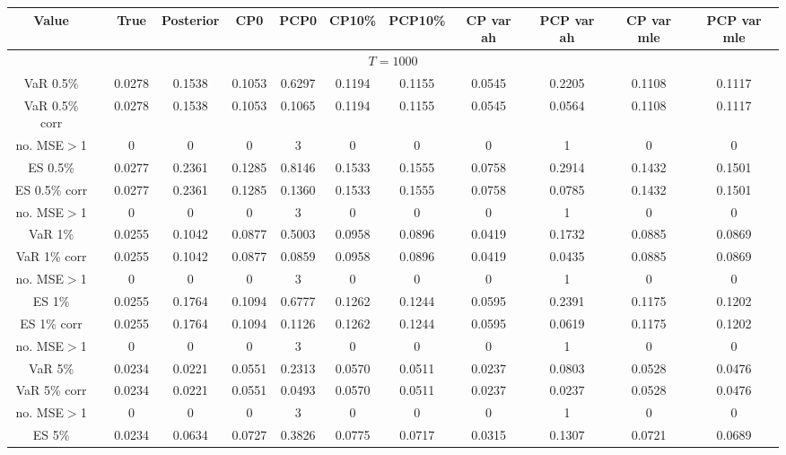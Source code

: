{ \tiny 
{ \renewcommand{\arraystretch}{1.1} 
\begin{sidewaystable} 
\center 
\begin{tabular}{cc cc | cccc | cccc} 
Value && True & Posterior & CP0  & PCP0 & CP10\%  & PCP10\% &CP var ah & PCP var ah & CP var mle & PCP var mle \\ \hline 
\hline 
\multicolumn{12}{c}{$T =1000$}  \\ 
\hline 
VaR 0.5\% && 0.0278 & 0.1538 & 0.1053 & 0.6297 & 0.1194 & 0.1155 &0.0545 & 0.2205 & 0.1108 & 0.1117 \\ 
VaR 0.5\% corr && 0.0278 & 0.1538 & 0.1053 & 0.1065 & 0.1194 & 0.1155 &0.0545 & 0.0564 & 0.1108 & 0.1117 \\ 
no. MSE$>$1 && 0 & 0 & 0 & 3 & 0 & 0 &0 & 1 & 0 & 0 \\[1ex] 
ES 0.5\% && 0.0277 & 0.2361 & 0.1285 & 0.8146 & 0.1533 & 0.1555 &0.0758 & 0.2914 & 0.1432 & 0.1501 \\ 
ES 0.5\% corr && 0.0277 & 0.2361 & 0.1285 & 0.1360 & 0.1533 & 0.1555 &0.0758 & 0.0785 & 0.1432 & 0.1501 \\ 
no. MSE$>$1 && 0 & 0 & 0 & 3 & 0 & 0 &0 & 1 & 0 & 0 \\[1.5ex]  
 \rowcolor{LightCyan} 
VaR 1\% && 0.0255 & 0.1042 & 0.0877 & 0.5003 & 0.0958 & 0.0896 &0.0419 & 0.1732 & 0.0885 & 0.0869 \\  
 \rowcolor{LightCyan} 
VaR 1\% corr && 0.0255 & 0.1042 & 0.0877 & 0.0859 & 0.0958 & 0.0896 &0.0419 & 0.0435 & 0.0885 & 0.0869 \\ 
 \rowcolor{LightCyan} 
no. MSE$>$1 && 0 & 0 & 0 & 3 & 0 & 0 &0 & 1 & 0 & 0 \\[1ex] 
 \rowcolor{LightCyan} 
ES 1\% && 0.0255 & 0.1764 & 0.1094 & 0.6777 & 0.1262 & 0.1244 &0.0595 & 0.2391 & 0.1175 & 0.1202 \\ 
 \rowcolor{LightCyan} 
ES 1\% corr && 0.0255 & 0.1764 & 0.1094 & 0.1126 & 0.1262 & 0.1244 &0.0595 & 0.0619 & 0.1175 & 0.1202 \\ 
 \rowcolor{LightCyan} 
no. MSE$>$1 && 0 & 0 & 0 & 3 & 0 & 0 &0 & 1 & 0 & 0 \\[1.5ex] 
VaR 5\% && 0.0234 & 0.0221 & 0.0551 & 0.2313 & 0.0570 & 0.0511 &0.0237 & 0.0803 & 0.0528 & 0.0476 \\ 
VaR 5\% corr && 0.0234 & 0.0221 & 0.0551 & 0.0493 & 0.0570 & 0.0511 &0.0237 & 0.0237 & 0.0528 & 0.0476 \\ 
no. MSE$>$1 && 0 & 0 & 0 & 3 & 0 & 0 &0 & 1 & 0 & 0 \\[1ex] 
ES 5\% && 0.0234 & 0.0634 & 0.0727 & 0.3826 & 0.0775 & 0.0717 &0.0315 & 0.1307 & 0.0721 & 0.0689 \\ 

\end{tabular}
\end{sidewaystable}}}

